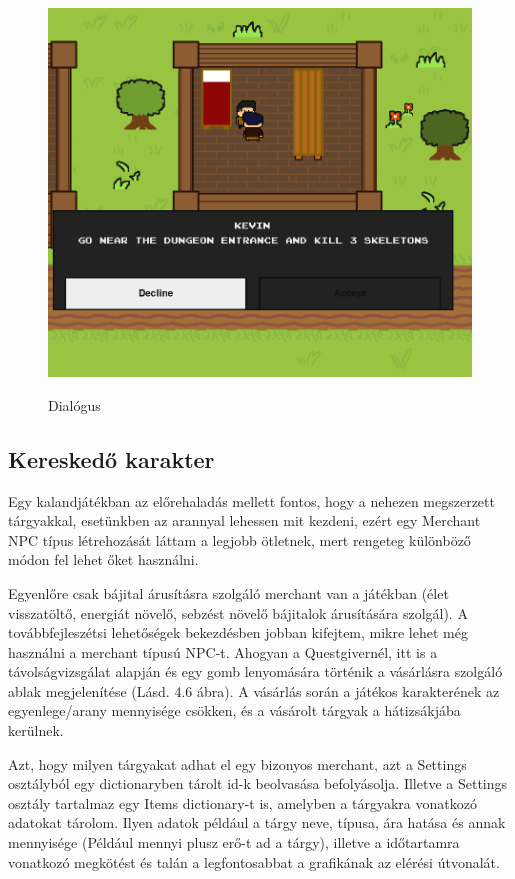 \begin{figure}[H]
    \centering
    \includegraphics[width=14.0truecm]{images/dialogue.png}
    \caption{Dialógus}
    \label{fig:Dialógus rendszer}\cite{dialogue}
\end{figure}

\subsection{Kereskedő karakter}

\indent \indent Egy kalandjátékban az előrehaladás mellett fontos, hogy a nehezen megszerzett tárgyakkal, esetünkben az arannyal lehessen mit kezdeni, ezért egy Merchant NPC típus létrehozását láttam a legjobb ötletnek, mert rengeteg különböző módon fel lehet őket használni. 

Egyenlőre csak bájital árusításra szolgáló merchant van a játékban (élet visszatöltő, energiát növelő, sebzést növelő bájitalok árusítására szolgál). A továbbfejleszétsi lehetőségek bekezdésben jobban kifejtem, mikre lehet még használni a merchant típusú NPC-t.  Ahogyan a Questgivernél, itt is a távolságvizsgálat alapján és egy gomb lenyomására történik a vásárlásra szolgáló ablak megjelenítése (Lásd. 4.6 ábra). A vásárlás során a játékos karakterének az egyenlege/arany mennyisége csökken, és a vásárolt tárgyak a hátizsákjába kerülnek.

Azt, hogy milyen tárgyakat adhat el egy bizonyos merchant, azt a Settings osztályból egy dictionaryben tárolt id-k beolvasása befolyásolja. Illetve a Settings osztály tartalmaz egy Items dictionary-t is, amelyben a tárgyakra vonatkozó adatokat tárolom. Ilyen adatok például a tárgy neve, típusa, ára hatása és annak mennyisége (Például mennyi plusz erő-t ad a tárgy), illetve a időtartamra vonatkozó megkötést és talán a legfontosabbat a grafikának az elérési útvonalát.  

